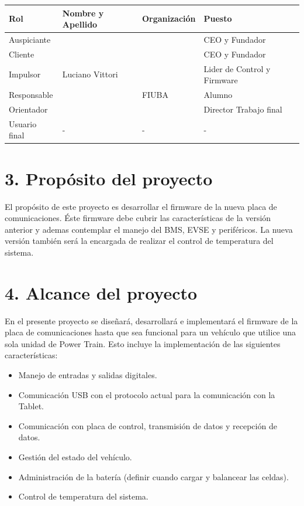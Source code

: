 \documentclass[
11pt, %
codirector, %
]{charter}
\begin{document}
\begin{table}[ht]
	\begin{tabularx}{\linewidth}{@{}|l|X|X|l|@{}}
		\hline
		\rowcolor[HTML]{C0C0C0}
		Rol           & Nombre y Apellido & Organización    & Puesto                      \\ \hline
		Auspiciante   & \clientename      & \empclientename & CEO y Fundador              \\ \hline
		Cliente       & \clientename      & \empclientename & CEO y Fundador              \\ \hline
		Impulsor      & Luciano Vittori   & \empclientename & Lider de Control y Firmware \\ \hline
		Responsable   & \authorname       & FIUBA           & Alumno                      \\ \hline
		Orientador    & \supname          & \pertesupname   & Director Trabajo final      \\ \hline
		Usuario final & -                 & -               & -                           \\ \hline
	\end{tabularx}
\end{table}





\section{3. Propósito del proyecto}
\label{sec:proposito}

El propósito de este proyecto es desarrollar el firmware de la nueva placa de comunicaciones. Éste firmware debe cubrir las características de la versión anterior y ademas contemplar el manejo del BMS, EVSE y periféricos.
La nueva versión también será la encargada de realizar el control de temperatura del sistema.

\section{4. Alcance del proyecto}
\label{sec:alcance}

En el presente proyecto se diseñará, desarrollará e implementará el firmware de la placa de comunicaciones hasta que sea funcional para un vehículo que utilice una sola unidad de Power Train.
Esto incluye la implementación de las siguientes características:
\begin{itemize}
	\item Manejo de entradas y salidas digitales.
	\item Comunicación USB con el protocolo actual para la comunicación con la Tablet.
	\item Comunicación con placa de control, transmisión de datos y recepción de datos.
	\item Gestión del estado del vehículo.
	\item Administración de la batería (definir cuando cargar y balancear las celdas).
	\item Control de temperatura del sistema.
\end{itemize}
\end{document}
